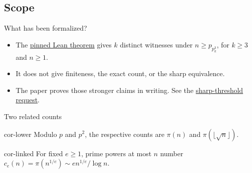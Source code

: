 \documentclass{beamer}
\begin{document}
\subsection{Scope}
\begin{frame}{What has been formalized?}
  \begin{itemize}
    \item The \href{https://github.com/the-omega-institute/trureturing/blob/3d781ae04219d5c99e87e82e3bbc3f6816e3691e/D5/S3/Arith/PrimeRemainders/OeisA222759Growth.lean\#L25}{pinned Lean theorem} gives $k$ distinct witnesses under $n\ge p_{p_k^3}$, for $k\ge3$ and $n\ge1$.
    \item It does not give finiteness, the exact count, or the sharp equivalence.
    \item The paper proves those stronger claims in writing. See the \href{https://github.com/the-omega-institute/trureturing-requests/issues/582}{sharp-threshold request}.
  \end{itemize}
\end{frame}
\appendix
\begin{frame}{Two related counts}
  \begin{bookresult}{cor-lower}
    Modulo $p$ and $p^2$, the respective counts are $\pi(n)$ and $\pi(\lfloor\sqrt n\rfloor)$.
  \end{bookresult}
  \begin{bookresult}{cor-linked}
    For fixed $e\ge1$, prime powers at most $n$ number
    $c_e(n)=\pi(n^{1/e})\sim e n^{1/e}/\log n$.
  \end{bookresult}
\end{frame}
\FormalVerification
\end{document}
